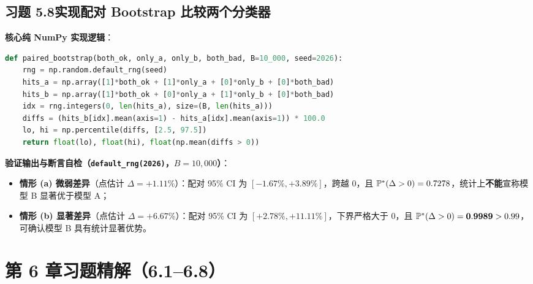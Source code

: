 \subsection*{习题 5.8\quad 实现配对 Bootstrap 比较两个分类器}
\textbf{核心纯 NumPy 实现逻辑}：
\begin{lstlisting}[language=Python]
def paired_bootstrap(both_ok, only_a, only_b, both_bad, B=10_000, seed=2026):
    rng = np.random.default_rng(seed)
    hits_a = np.array([1]*both_ok + [1]*only_a + [0]*only_b + [0]*both_bad)
    hits_b = np.array([1]*both_ok + [0]*only_a + [1]*only_b + [0]*both_bad)
    idx = rng.integers(0, len(hits_a), size=(B, len(hits_a)))
    diffs = (hits_b[idx].mean(axis=1) - hits_a[idx].mean(axis=1)) * 100.0
    lo, hi = np.percentile(diffs, [2.5, 97.5])
    return float(lo), float(hi), float(np.mean(diffs > 0))
\end{lstlisting}
\textbf{验证输出与断言自检（\texttt{default\_rng(2026)}，$B=10{,}000$）}：
\begin{itemize}
  \item \textbf{情形 (a) 微弱差异}（点估计 $\Delta = +1.11\%$）：配对 95\% CI 为 $\mathbf{[-1.67\%, +3.89\%]}$，跨越 $0$，且 $\mathbb{P}^*(\Delta > 0) = 0.7278$，统计上\textbf{不能}宣称模型 B 显著优于模型 A；
  \item \textbf{情形 (b) 显著差异}（点估计 $\Delta = +6.67\%$）：配对 95\% CI 为 $\mathbf{[+2.78\%, +11.11\%]}$，下界严格大于 $0$，且 $\mathbb{P}^*(\Delta > 0) = \mathbf{0.9989} > 0.99$，可确认模型 B 具有统计显著优势。
\end{itemize}

\section{第 6 章习题精解（6.1--6.8）}

